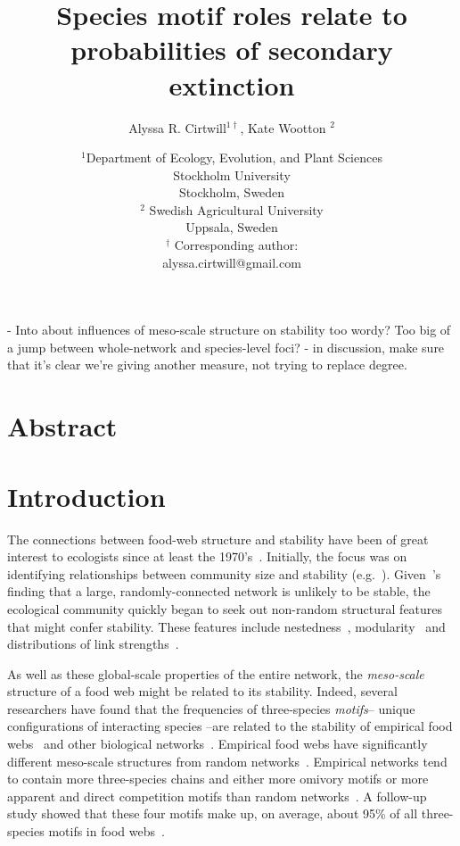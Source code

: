 \documentclass[12pt]{article}
\title{Species motif roles relate to probabilities of secondary extinction}
\author{Alyssa R. Cirtwill$^{1\dagger}$, Kate Wootton $^{2}$}
\date{\small$^1$Department of Ecology, Evolution, and Plant Sciences\\ 
Stockholm University\\
Stockholm, Sweden\\
\medskip
\small$^2$ Swedish Agricultural University\\
Uppsala, Sweden\\
\medskip
$^\dagger$ Corresponding author:\\
alyssa.cirtwill@gmail.com\\
 }
\begin{document}
 
\maketitle 
\raggedright
\setlength{\parindent}{15pt} 


- Into about influences of meso-scale structure on stability too wordy? Too big of a jump between whole-network and species-level foci?
- in discussion, make sure that it's clear we're giving another measure, not trying to replace degree.

\section*{Abstract}


\section*{Introduction}

	The connections between food-web structure and stability have been of great interest to ecologists since at least the 1970's~\citep{May1972}. Initially, the focus was on identifying relationships between community size and stability (e.g.~\citealp{Gardner1970,May1972}). Given~\citet{May1972}'s finding that a large, randomly-connected network is unlikely to be stable, the ecological community quickly began to seek out non-random structural features that might confer stability. These features include nestedness~\citep{}, modularity~\citep{} and distributions of link strengths~\citep{McCann1998,Gross2009,Rooney2012,Wootton2016}. 


	As well as these global-scale properties of the entire network, the \emph{meso-scale} structure of a food web might be related to its stability. Indeed, several researchers have found that the frequencies of three-species \emph{motifs}-- unique configurations of interacting species --are related to the stability of empirical food webs~\citep{Stouffer2007,Borrelli2015,Monteiro2016} and other biological networks~\citep{Prill2005}. Empirical food webs have significantly different meso-scale structures from random networks~\citep{Stouffer2007}. Empirical networks tend to contain more three-species chains and either more omivory motifs or more apparent and direct competition motifs than random networks~\citep{Stouffer2007}. A follow-up study showed that these four motifs make up, on average, about 95\% of all three-species motifs in food webs~\citep{Stouffer2010b}. 
\end{document}
